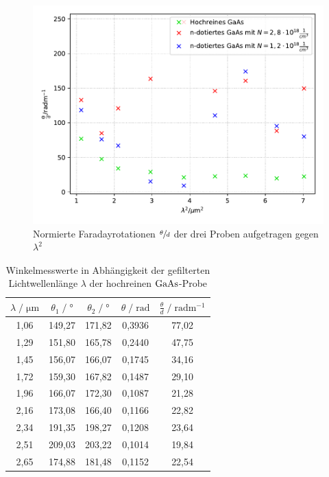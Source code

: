 \begin{figure}[H]
    \centering
    \includegraphics[scale=0.7]{content/plot2.pdf}
    \caption{Normierte Faradayrotationen $\sfrac{\theta}{d}$ der drei Proben aufgetragen gegen $\lambda^2$}
    \label{fig:plot2}
\end{figure}

\begin{table}
    \centering
    \caption{Winkelmesswerte in Abhängigkeit der gefilterten Lichtwellenlänge $\lambda$ 
        der hochreinen $\ce{GaAs}$-Probe}
    \label{tab:mess2}
    \begin{tabular}{c c c c c}
    \toprule
    $\lambda \;/\; \si{\micro\meter}$ & $\theta_1 \;/\; \si{\degree}$ &  $\theta_2 \;/\; \si{\degree}$ & 
    $\theta \;/\; \si{\radian}$ &  $\frac{\theta}{d} \;/\; \si{\radian\meter\tothe{-1}}$\\
    \midrule
        1,06 & 149,27 & 171,82 & 0,3936 & 77,02 \\
        1,29 & 151,80 & 165,78 & 0,2440 & 47,75 \\
        1,45 & 156,07 & 166,07 & 0,1745 & 34,16 \\
        1,72 & 159,30 & 167,82 & 0,1487 & 29,10 \\
        1,96 & 166,07 & 172,30 & 0,1087 & 21,28 \\
        2,16 & 173,08 & 166,40 & 0,1166 & 22,82 \\
        2,34 & 191,35 & 198,27 & 0,1208 & 23,64 \\
        2,51 & 209,03 & 203,22 & 0,1014 & 19,84 \\
        2,65 & 174,88 & 181,48 & 0,1152 & 22,54 \\
    \bottomrule
    \end{tabular}
\end{table}

